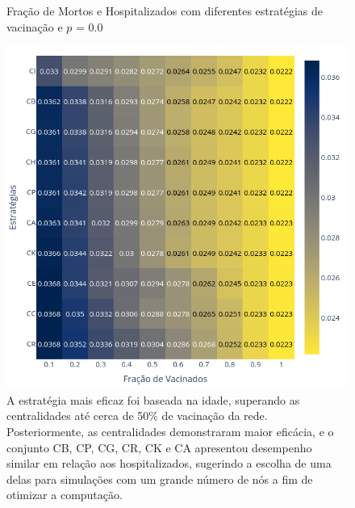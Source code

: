 \begin{figure}[H]
    \centering
    \captionsetup{font=normalsize,skip=0.8pt,singlelinecheck=on,labelsep=endash}
    \caption{Fração de Mortos e Hospitalizados com diferentes estratégias de vacinação e $p$ = 0.0}
    \includegraphics[scale= 0.45]{figuras/vacinas_heat_Hospitalizados_0.00.png}
    \captionsetup{font=small,justification=justified}
    \caption*{A estratégia mais eficaz foi baseada na idade, superando as centralidades até cerca de 50\% de vacinação da rede. Posteriormente, as centralidades demonstraram maior eficácia, e o conjunto CB, CP, CG, CR, CK e CA apresentou desempenho similar em relação aos hospitalizados, sugerindo a escolha de uma delas para simulações com um grande número de nós a fim de otimizar a computação.}
    \label{fig:vacinas_Hospitalizados_0.0}
\end{figure}

